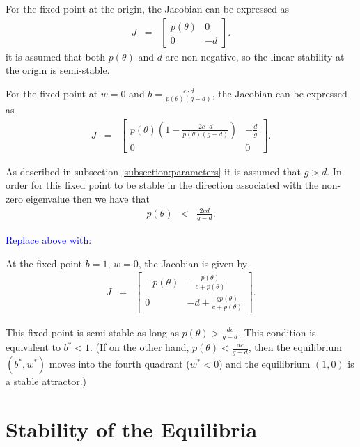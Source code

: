 \documentclass[review]{elsarticle}
\begin{document}
For the fixed point at the origin, the Jacobian can be expressed as 
\begin{eqnarray*}
  J & = & \left[
          \begin{array}{rr}
            p(\theta) & 0 \\
            0 & -d
          \end{array}
          \right].
\end{eqnarray*}
it is assumed that both $p(\theta)$ and $d$ are non-negative, so the
linear stability at the origin is semi-stable.

For the fixed point at $w=0$ and
$b=\frac{c\cdot d}{p(\theta)\left(g - d\right)}$, the Jacobian can be
expressed as 
\begin{eqnarray*}
  J & = & \left[
          \begin{array}{rr}
            p(\theta)\left( 1 -
            \frac{2c\cdot d}{p(\theta)(g-d)} \right) & -\frac{d}{g} \\
            0 & 0
          \end{array}
          \right].
\end{eqnarray*}

As described in subsection \ref{subsection:parameters} it is assumed
that $g>d$. In order for this fixed point to be stable in the
direction associated with the non-zero eigenvalue then we have that
\begin{eqnarray*}
  p(\theta) & < & \frac{2cd}{g-d}.
\end{eqnarray*}

\textcolor{blue}{Replace above with:}

At the fixed point $b=1$, $w=0$, the Jacobian is given by 
\begin{eqnarray*}
  J & = & \left[
          \begin{array}{rr}
            -p(\theta) & -\frac{p(\theta)}{c+p(\theta)} \\
            0 & -d+\frac{gp(\theta)}{c+p(\theta)}
          \end{array}
          \right].
\end{eqnarray*}

This fixed point is semi-stable as long as $p(\theta) >\frac{dc}{g-d}$.  This condition is equivalent to $b^* < 1$.  (If on the other hand, $p(\theta) <\frac{dc}{g-d}$, then the equilibrium $(b^*,w^*)$ moves into the fourth quadrant ($w^*<0$) and the equilibrium $(1,0)$ is a stable attractor.)
\section{Stability of the Equilibria}
\label{appendix:stability}
\end{document}

